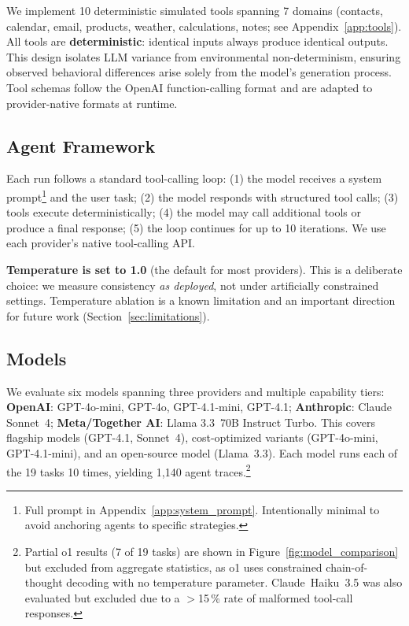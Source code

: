 \documentclass[letterpaper]{article}
\begin{document}
We implement 10 deterministic simulated tools spanning 7 domains (contacts,
calendar, email, products, weather, calculations, notes; see
Appendix~\ref{app:tools}). All tools are \textbf{deterministic}: identical inputs
always produce identical outputs. This design isolates LLM variance from
environmental non-determinism, ensuring observed behavioral differences arise
solely from the model's generation process. Tool schemas follow the OpenAI
function-calling format and are adapted to provider-native formats at runtime.

\subsection{Agent Framework}

Each run follows a standard tool-calling loop: (1) the model receives a system
prompt\footnote{Full prompt in Appendix~\ref{app:system_prompt}. Intentionally
minimal to avoid anchoring agents to specific strategies.} and the user task;
(2) the model responds with structured tool calls; (3) tools execute
deterministically; (4) the model may call additional tools or produce a final
response; (5) the loop continues for up to 10 iterations. We use each provider's
native tool-calling API.

\textbf{Temperature is set to 1.0} (the default for most providers). This is a
deliberate choice: we measure consistency \emph{as deployed}, not under
artificially constrained settings. Temperature ablation is a known limitation and
an important direction for future work (Section~\ref{sec:limitations}).

\subsection{Models}
\label{sec:models}

We evaluate six models spanning three providers and multiple capability tiers:
\textbf{OpenAI}: GPT-4o-mini, GPT-4o, GPT-4.1-mini, GPT-4.1;
\textbf{Anthropic}: Claude Sonnet~4;
\textbf{Meta/Together AI}: Llama 3.3~70B Instruct Turbo.
This covers flagship models (GPT-4.1, Sonnet~4), cost-optimized variants
(GPT-4o-mini, GPT-4.1-mini), and an open-source model (Llama~3.3).
Each model runs each of the 19 tasks 10 times, yielding 1,140 agent
traces.\footnote{Partial o1 results (7 of 19 tasks) are shown in
Figure~\ref{fig:model_comparison} but excluded from aggregate statistics, as o1
uses constrained chain-of-thought decoding with no temperature parameter.
Claude~Haiku~3.5 was also evaluated but excluded due to a $>$15\,\% rate of
malformed tool-call responses.}
\end{document}
